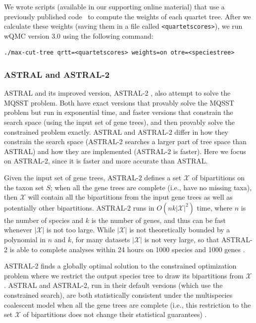 We wrote scripts (available in our supporting online  material)
that use a previously published code~\cite{JohansenThesis}
to compute the weights of each quartet tree.
After we calculate these weights (saving them in a 
file called {\tt <quartetscores>}),
we run wQMC version 3.0 using the following command:
\begin{verbatim}
./max-cut-tree qrtt=<quartetscores> weights=on otre=<speciestree>
\end{verbatim}

\subsubsection{ASTRAL and ASTRAL-2}
ASTRAL \cite{astral} and 
its improved version, 
ASTRAL-2 \cite{ASTRAL2}, 
also attempt to solve the MQSST problem.
Both have exact versions that provably solve the
MQSST problem but run in exponential time, and faster
versions that constrain the search space (using the input
set of gene trees), and then provably solve the
constrained problem exactly.
ASTRAL and ASTRAL-2 differ in
how they constrain the search space (ASTRAL-2 searches
a larger part of tree space than ASTRAL)  and how
they are implemented (ASTRAL-2 is faster). 
Here we focus on ASTRAL-2, since it is faster
and more accurate than ASTRAL. 

Given
the input set of gene trees, ASTRAL-2 defines a set $\mathcal{X}$ of
bipartitions on the taxon set $S$; when all the gene trees are
complete (i.e., have no missing taxa), then $\mathcal{X}$ will 
contain all the bipartitions from the input gene trees as well as potentially
other
bipartitions.
ASTRAL-2 runs in $O(n k |\mathcal{X}|^2)$ time, where
$n$ is the number of species and $k$ is the number of genes, and thus
can be fast whenever $|\mathcal{X}|$ is not too large.
While $|\mathcal{X}|$ is not theoretically bounded by
a polynomial in $n$ and $k$, 
for many datasets $|\mathcal{X}|$ is
not very large, so that
ASTRAL-2 is able to complete analyses 
within 24 hours  on 
1000 species and 1000 genes \cite{ASTRAL2}.

ASTRAL-2
finds a globally optimal solution to the constrained optimization problem
where we restrict the output species tree to draw its bipartitions
from $\mathcal{X}$. 
ASTRAL and ASTRAL-2, run in their default versions (which
use the constrained search),  are both
statistically consistent under the multispecies
coalescent model when all the gene trees are complete (i.e.,  this restriction
to the set $\mathcal{X}$ of bipartitions does not change
their statistical guarantees) \cite{ASTRAL2}.

